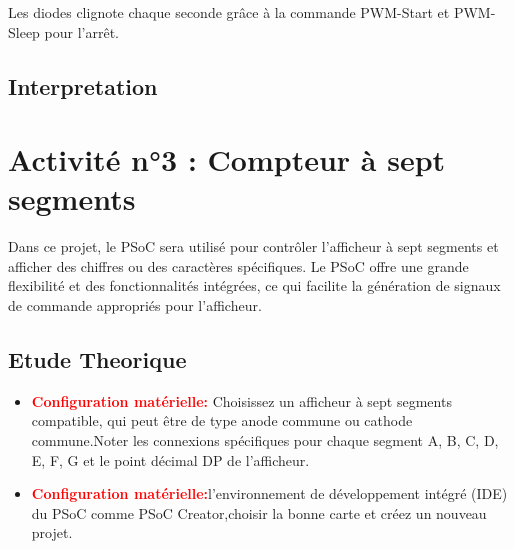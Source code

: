 Les diodes clignote chaque seconde grâce à la commande PWM-Start et  PWM-Sleep pour l’arrêt.
 
\subsection{Interpretation}
\label{sec:Interpretation}
 \section{Activité n°3 : Compteur à sept segments }
 \label{chap:Activité n°3 :Compteur à sept segments }
 Dans ce projet, le PSoC sera utilisé pour contrôler l'afficheur à sept 
 segments et afficher des chiffres ou des caractères spécifiques. 
 Le PSoC offre une grande flexibilité et des fonctionnalités intégrées, ce qui 
 facilite la génération de signaux de commande appropriés pour l'afficheur.
 
 \subsection{Etude Theorique}
 \label{sec:Etude Theorique}
 \begin{itemize}
     \item \textcolor{red}{\textbf{Configuration matérielle:}} Choisissez un afficheur à sept segments compatible, 
     qui peut être de type anode commune ou cathode commune.Noter les connexions spécifiques pour chaque segment A, B, C, D, E, F, G
     et le point décimal DP de l'afficheur.
     \item \textcolor{red}{\textbf{Configuration matérielle:}}l'environnement de développement intégré (IDE) du PSoC
      comme PSoC Creator,choisir la bonne carte et créez un nouveau projet.
 \end{itemize}
 
 
